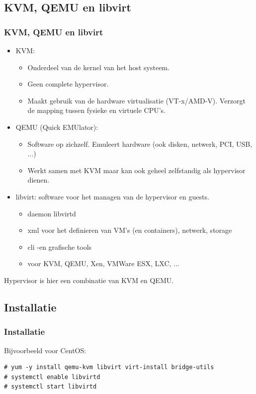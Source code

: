 \subsection {KVM, QEMU en libvirt}
\begin{styleframe}
    \frametitle{KVM, QEMU en libvirt}
{\scriptsize
\begin{itemize}
	\item KVM:
		\begin{itemize}
			\item Onderdeel van de kernel van het host systeem.
			\pause
			\item Geen complete hypervisor.
			\pause
			\item Maakt gebruik van de hardware virtualisatie (VT-x/AMD-V). Verzorgt de mapping tussen fysieke en virtuele CPU's.
			\pause
		\end{itemize}
	\item QEMU (Quick EMUlator):
		\begin{itemize}
			\item Software op zichzelf. Emuleert hardware (ook disken, netwerk, PCI, USB, ...)
			\pause
			\item Werkt samen met KVM maar kan ook geheel zelfstandig als hypervisor dienen.
			\pause
		\end{itemize}
	\item libvirt: software voor het managen van de hypervisor en guests.
		\begin{itemize}
			\item daemon libvirtd
			\pause
			\item xml voor het definieren van VM's (en containers), netwerk, storage
			\pause
			\item cli -en grafische tools
			\pause
			\item voor KVM, QEMU, Xen, VMWare ESX, LXC, ...
			\pause
		\end{itemize}
\end{itemize}
Hypervisor is hier een combinatie van KVM en QEMU.
}
\end{styleframe}


\subsection {Installatie}
\begin{styleframefrag}
    \frametitle{Installatie}
Bijvoorbeeld voor CentOS:
\scriptsize
\begin{verbatim}
# yum -y install qemu-kvm libvirt virt-install bridge-utils
# systemctl enable libvirtd
# systemctl start libvirtd
\end{verbatim}
\end{styleframefrag}

